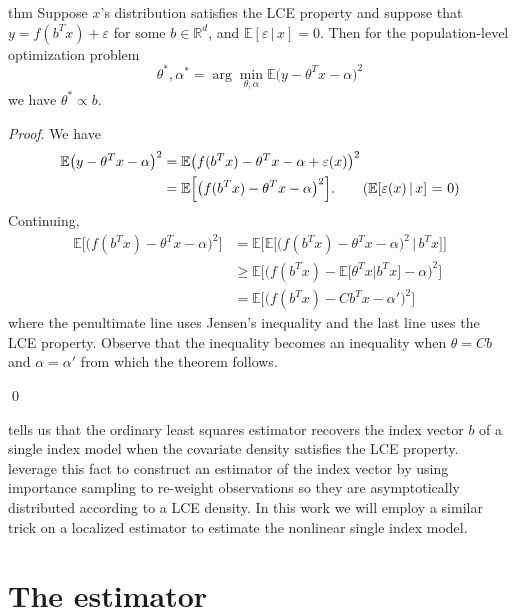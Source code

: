 \documentclass[11pt]{article}
\begin{document}
\begin{restatable}{thm}{} \label{thm: lce single index}
    Suppose $x$'s distribution satisfies the LCE property and suppose that $y = f(b^{T}x) + \varepsilon$ for some $b \in \mathbb{R}^d$, and $\mathbb{E}[\varepsilon \,| \, x] = 0$. Then for the population-level optimization problem 
    \[\theta^*, \alpha^* = \arg\min_{\theta, \alpha}\mathbb{E}\big(y - \theta^{T}x - \alpha\big)^2 \]
    we have $\theta^* \propto b$. 
\end{restatable}
\noindent \textit{Proof}. We have 
\begin{align*}
    \mathbb{E}\big(y - \theta^{T}x-\alpha\big)^2 &= \mathbb{E}\big(f(b^Tx) - \theta^{T}x-\alpha  + \varepsilon(x)\big)^2\\
    &= \mathbb{E}\Big[\big(f(b^{T}x) - \theta^{T}x-\alpha\big)^2\Big]. \tag{$\mathbb{E}[\varepsilon(x)\,|\,x]$ = 0}
\end{align*}
Continuing, 
\begin{align*}
    \mathbb{E}\Big[\big(f(b^{T}x) - \theta^{T}x-\alpha\big)^2\Big]&= \mathbb{E}\Big[ \mathbb{E}\Big[\big(f(b^{T}x) - \theta^{T}x-\alpha\big)^2 \, \Big | \, b^{T}x\Big] \Big] \\
    &\geq \mathbb{E}\Big[ \Big(f(b^{T}x) - \mathbb{E}\big[\theta^{T}x |b^{T}x\big]-\alpha\Big)^2 \Big] \\
    &= \mathbb{E}\Big[ \Big(f(b^{T}x) - Cb^{T}x-\alpha'\Big)^2 \Big]
\end{align*}
where the penultimate line uses Jensen's inequality and the last line uses the LCE property. Observe that the inequality becomes an inequality when $\theta = Cb$ and $\alpha = \alpha'$ from which the theorem follows. 

\qed{}

 tells us that the ordinary least squares estimator recovers the index vector $b$ of a single index model when the covariate density satisfies the LCE property. \citet{Newey_Ruud_2005} leverage this fact to construct an estimator of the index vector by using importance sampling to re-weight observations so they are asymptotically distributed according to a LCE density. In this work we will employ a similar trick on a localized estimator to estimate the nonlinear single index model. 

\section{The estimator}
\end{document}
